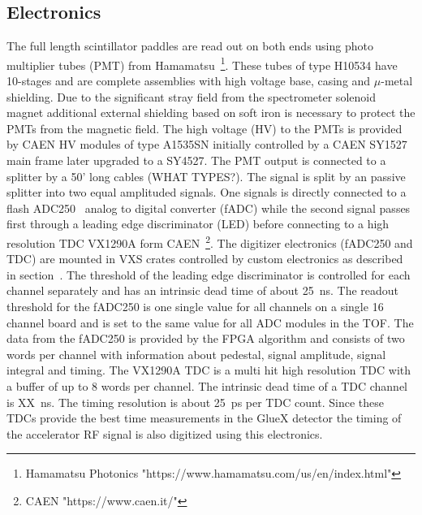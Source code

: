 \subsection{Electronics \label{sec:scelectronics}}
The full length scintillator paddles are read out on both ends using photo multiplier tubes (PMT) from Hamamatsu~\footnote{Hamamatsu Photonics "https://www.hamamatsu.com/us/en/index.html"}. These tubes of type H10534 have 10-stages and are complete assemblies with high voltage base, casing and $\mu$-metal shielding. Due to the significant stray field from the spectrometer solenoid magnet additional external
shielding based on soft iron is necessary to protect the PMTs from the magnetic field.
The high voltage (HV) to the PMTs is provided by CAEN HV modules of type A1535SN initially controlled by a CAEN SY1527 main frame
later upgraded to a SY4527.
The PMT output is connected to a splitter by a 50' long cables (WHAT TYPES?). The signal is split by
an passive splitter into two equal amplituded signals. One signals is directly connected to a flash ADC250~\cite{Dong:2007}
analog to digital converter (fADC) while the second signal passes first through a leading edge discriminator (LED) before connecting to 
a high resolution TDC VX1290A form CAEN~\footnote{CAEN "https://www.caen.it/"}. The digitizer electronics (fADC250 and TDC) are mounted
in VXS crates controlled by custom electronics as described in section~\label{sec:online}.
The threshold of the leading edge discriminator is controlled for each channel separately and has an intrinsic
dead time of about 25~ns.
The readout threshold for
the fADC250 is one single value for all channels on a single 16 channel board and is set to the same value for
all ADC modules in the TOF. The data from the fADC250 is provided by the FPGA algorithm and consists
of two words per channel with information about pedestal, signal amplitude, signal integral and timing.
The VX1290A TDC is a multi hit high resolution TDC with a buffer of 
up to 8 words per channel. The intrinsic dead time of a TDC channel is XX~ns. The timing resolution is about 25~ps per TDC count.
Since these TDCs provide the best time measurements in the GlueX detector the timing of the accelerator RF signal is also
digitized using this electronics.


